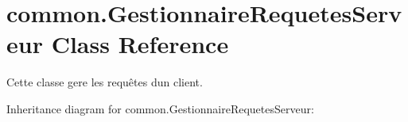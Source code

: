 \hypertarget{classcommon_1_1GestionnaireRequetesServeur}{}\section{common.\+Gestionnaire\+Requetes\+Serveur Class Reference}
\label{classcommon_1_1GestionnaireRequetesServeur}


Cette classe gere les requêtes d\textquotesingle{}un client.  




Inheritance diagram for common.\+Gestionnaire\+Requetes\+Serveur\+:
